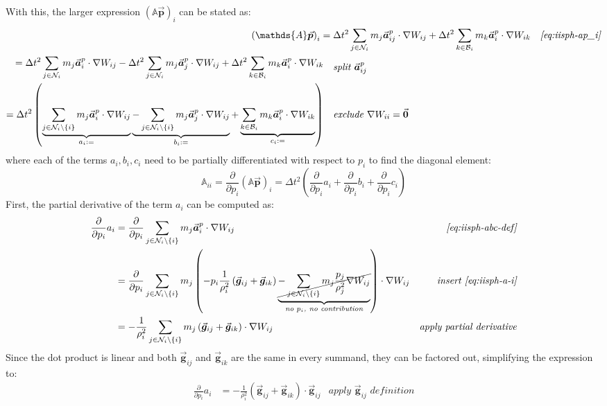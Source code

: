 \documentclass[oneside, a4paper]{book}
\newcommand\pdpi[0]{\frac{\partial}{\partial p_i}}
\newcommand\vek[1]{\vec{\bm{#1}}}
\newcommand\br[1]{\left(#1\right)}
\begin{document}
    With this, the larger expression $\br{\mathds{A}\vek{p}}_i$ can be stated as:
    \begin{align}
      \br{\mathds{A}\vek{p}}_{i}
      ={}&\Delta t^2 \sum_{j\in\mathcal{N}_i} m_j \vek{a}^p_{ij} \cdot \nabla W_{ij}
      +\Delta t^2 \sum_{k\in\mathcal{B}_i} m_k \vek{a}^p_{i} \cdot \nabla W_{ik} 
      &\textit{\autoref{eq:iisph-ap_i}}\\
      \begin{split}
        ={}&\Delta t^2 \sum_{j\in\mathcal{N}_i} m_j \vek{a}^p_{i} \cdot \nabla W_{ij}
        -\Delta t^2 \sum_{j\in\mathcal{N}_i} m_j \vek{a}^p_{j} \cdot \nabla W_{ij} +\Delta t^2 \sum_{k\in\mathcal{B}_i} m_k \vek{a}^p_{i} \cdot \nabla W_{ik}
      \end{split}
      &\textit{split $\vek{a}^p_{ij}$}\\
      \begin{split}
        ={}&\Delta t^2 
        \br{
          \underbrace{\sum_{j\in\mathcal{N}_i\setminus \{i\}} m_j \vek{a}^p_{i} \cdot \nabla W_{ij}}_{a_i:=}
          \underbrace{-\sum_{j\in\mathcal{N}_i\setminus \{i\}} m_j \vek{a}^p_{j} \cdot \nabla W_{ij} }_{b_i:=}
          +\underbrace{\sum_{k\in\mathcal{B}_i} m_k \vek{a}^p_{i} \cdot \nabla W_{ik}}_{c_i:=}
        }
      \end{split}
      &\textit{exclude $\nabla W_{ii}=\vek{0}$}\label{eq:iisph-abc-def}
    \end{align}
    where each of the terms $a_i,b_i,c_i$ need to be partially differentiated with respect to $p_i$ to find the diagonal element:
    \begin{equation}
      \mathds{A}_{ii} = \pdpi \br{\mathds{A}\vek{p}}_{i} = \Delta t^2\br{\pdpi a_i + \pdpi b_i + \pdpi c_i}\label{eq:iisph-ai-bi-ci}
    \end{equation}
    First, the partial derivative of the term $a_i$ can be computed as:
    \begin{align*}
      \pdpi a_i &=
      \pdpi \sum_{j\in\mathcal{N}_i\setminus \{i\}} m_j \vek{a}^p_{i} \cdot \nabla W_{ij} &\textit{\autoref{eq:iisph-abc-def}}\\
      &= \pdpi \sum_{j\in\mathcal{N}_i\setminus \{i\}} m_j \br{
        -p_i \frac{1}{\rho_i^2}\br{
        \vek{g}_{ij}
        +\vek{g}_{ik}
      }
      \underbrace{
        \cancel{- \sum_{j\in\mathcal{N}_i\setminus \{i\}} 
        m_j\frac{p_j}{\rho_j^2} \nabla W_{ij} }
      }_{\textit{no $p_i$, no contribution}}
      } \cdot \nabla W_{ij} &\textit{insert \autoref{eq:iisph-a-i}}\\
      &= -\frac{1}{\rho_i^2} \sum_{j\in\mathcal{N}_i\setminus \{i\}} m_j \br{\vek{g}_{ij} +\vek{g}_{ik}
      } \cdot \nabla W_{ij} &\textit{apply partial derivative}
    \end{align*}
    Since the dot product is linear and both $\vek{g}_{ij}$ and $\vek{g}_{ik}$ are the same in every summand, they can be factored out, simplifying the expression to:
    \begin{align}
      \pdpi a_i &= -\frac{1}{\rho_i^2} \br{\vek{g}_{ij} +\vek{g}_{ik}} \cdot \vek{g}_{ij} &\textit{apply $\vek{g}_{ij}$ definition}\label{eq:iisph-dai-dpi}
    \end{align}
\end{document}
